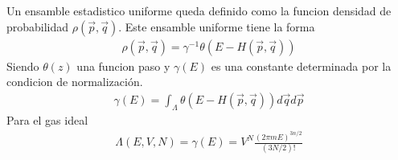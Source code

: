 \documentclass{article}
\begin{document}
Un ensamble estadistico uniforme queda definido como la funcion densidad de probabilidad $ \rho(\vec p, \vec q ) $. Este ensamble uniforme tiene la forma 
\begin{gather*}
  \rho(\vec p, \vec q ) = \gamma ^ {-1 } \theta (E - H (\vec p, \vec q ))
\end{gather*}
Siendo $ \theta(z)  $ una funcion paso y $ \gamma(E)  $ es una constante determinada por la condicion de normalización. 
\begin{gather*}
  \gamma(E) = \int_{\Lambda}^{}  \theta (E - H (\vec p, \vec q )) d\vec q d\vec p
\end{gather*}
Para el gas ideal 
\begin{gather*}
  \Lambda(E,V,N) = \gamma(E) = V ^ {N } \frac{(2\pi m E ) ^ {3n/2 }}{(3N/2)!} 
\end{gather*}
\end{document}
